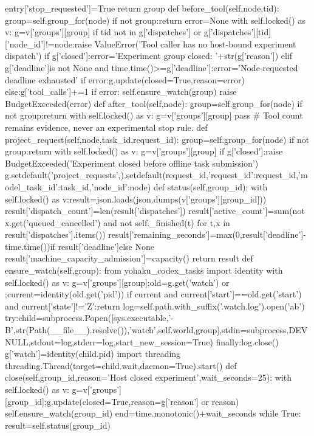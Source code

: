    entry['stop_requested']=True
  return group
 def before_tool(self,node,tid):
  group=self.group_for(node)
  if not group:return
  error=None
  with self.locked() as v:
   g=v['groups'][group]
   if tid not in g['dispatches'] or g['dispatches'][tid]['node_id']!=node:raise ValueError('Tool caller has no host-bound experiment dispatch')
   if g['closed']:error='Experiment group closed: '+str(g['reason'])
   elif g['deadline']is not None and time.time()>=g['deadline']:error='Node-requested deadline exhausted'
   if error:g.update(closed=True,reason=error)
   else:g['tool_calls']+=1
  if error:
   self.ensure_watch(group)
   raise BudgetExceeded(error)
 def after_tool(self,node):
  group=self.group_for(node)
  if not group:return
  with self.locked() as v:
   g=v['groups'][group]
   pass # Tool count remains evidence, never an experimental stop rule.
 def project_request(self,node,task_id,request_id):
  group=self.group_for(node)
  if not group:return
  with self.locked() as v:
   g=v['groups'][group]
   if g['closed']:raise BudgetExceeded('Experiment closed before offline task submission')
   g.setdefault('project_requests',{}).setdefault(request_id,{'request_id':request_id,'model_task_id':task_id,'node_id':node})
 def status(self,group_id):
  with self.locked() as v:result=json.loads(json.dumps(v['groups'][group_id]))
  result['dispatch_count']=len(result['dispatches'])
  result['active_count']=sum(not x.get('queued_cancelled') and not self._finished(t) for t,x in result['dispatches'].items())
  result['remaining_seconds']=max(0,result['deadline']-time.time())if result['deadline']else None
  result['machine_capacity_admission']=capacity()
  return result
 def ensure_watch(self,group):
  from yohaku_codex_tasks import identity
  with self.locked() as v:
   g=v['groups'][group];old=g.get('watch') or {};current=identity(old.get('pid'))
   if current and current['start']==old.get('start') and current['state']!='Z':return
   log=self.path.with_suffix('.watch.log').open('ab')
   try:child=subprocess.Popen([sys.executable,'-B',str(Path(__file__).resolve()),'watch',self.world,group],stdin=subprocess.DEVNULL,stdout=log,stderr=log,start_new_session=True)
   finally:log.close()
   g['watch']=identity(child.pid)
   import threading
   threading.Thread(target=child.wait,daemon=True).start()
 def close(self,group_id,reason='Host closed experiment',wait_seconds=25):
  with self.locked() as v:
   g=v['groups'][group_id];g.update(closed=True,reason=g['reason'] or reason)
  self.ensure_watch(group_id)
  end=time.monotonic()+wait_seconds
  while True:
   result=self.status(group_id)
